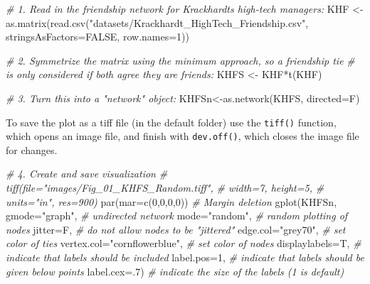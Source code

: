 \documentclass[
  notitlepage,
  onecolumn,
  openany]{book}
\newenvironment{Shaded}{\begin{snugshade}}{\end{snugshade}}
\newcommand{\AttributeTok}[1]{\textcolor[rgb]{0.77,0.63,0.00}{#1}}
\newcommand{\CommentTok}[1]{\textcolor[rgb]{0.56,0.35,0.01}{\textit{#1}}}
\newcommand{\ConstantTok}[1]{\textcolor[rgb]{0.00,0.00,0.00}{#1}}
\newcommand{\DecValTok}[1]{\textcolor[rgb]{0.00,0.00,0.81}{#1}}
\newcommand{\FunctionTok}[1]{\textcolor[rgb]{0.00,0.00,0.00}{#1}}
\newcommand{\NormalTok}[1]{#1}
\newcommand{\OtherTok}[1]{\textcolor[rgb]{0.56,0.35,0.01}{#1}}
\newcommand{\SpecialCharTok}[1]{\textcolor[rgb]{0.00,0.00,0.00}{#1}}
\newcommand{\StringTok}[1]{\textcolor[rgb]{0.31,0.60,0.02}{#1}}
\begin{document}
\begin{Shaded}
\begin{Highlighting}[]
\CommentTok{\# 1. Read in the friendship network for Krackhardt\textquotesingle{}s high{-}tech managers:}
\NormalTok{KHF }\OtherTok{\textless{}{-}} \FunctionTok{as.matrix}\NormalTok{(}\FunctionTok{read.csv}\NormalTok{(}\StringTok{"datasets/Krackhardt\_HighTech\_Friendship.csv"}\NormalTok{,}
                          \AttributeTok{stringsAsFactors=}\ConstantTok{FALSE}\NormalTok{, }\AttributeTok{row.names=}\DecValTok{1}\NormalTok{))}


\CommentTok{\# 2. Symmetrize the matrix using the minimum approach, so a friendship tie}
\CommentTok{\# is only considered if both agree they are friends:}
\NormalTok{KHFS }\OtherTok{\textless{}{-}}\NormalTok{ KHF}\SpecialCharTok{*}\FunctionTok{t}\NormalTok{(KHF)}

\CommentTok{\# 3. Turn this into a "network" object:}
\NormalTok{KHFSn}\OtherTok{\textless{}{-}}\FunctionTok{as.network}\NormalTok{(KHFS, }\AttributeTok{directed=}\NormalTok{F)}
\end{Highlighting}
\end{Shaded}

To save the plot as a tiff file (in the default folder) use the \texttt{tiff()} function, which opens an image file,
and finish with \texttt{dev.off()}, which closes the image file for changes.

\begin{Shaded}
\begin{Highlighting}[]
\CommentTok{\# 4. Create and save visualization}
\CommentTok{\# tiff(file="images/Fig\_01\_KHFS\_Random.tiff", }
\CommentTok{\#      width=7, height=5,}
\CommentTok{\#      units="in", res=900)}
\FunctionTok{par}\NormalTok{(}\AttributeTok{mar=}\FunctionTok{c}\NormalTok{(}\DecValTok{0}\NormalTok{,}\DecValTok{0}\NormalTok{,}\DecValTok{0}\NormalTok{,}\DecValTok{0}\NormalTok{)) }\CommentTok{\# Margin deletion}
\FunctionTok{gplot}\NormalTok{(KHFSn,}
      \AttributeTok{gmode=}\StringTok{"graph"}\NormalTok{,      }\CommentTok{\# undirected network}
      \AttributeTok{mode=}\StringTok{"random"}\NormalTok{,      }\CommentTok{\# random plotting of nodes}
      \AttributeTok{jitter=}\NormalTok{F,           }\CommentTok{\# do not allow nodes to be "jittered"}
      \AttributeTok{edge.col=}\StringTok{"grey70"}\NormalTok{,  }\CommentTok{\# set color of ties}
      \AttributeTok{vertex.col=}\StringTok{"cornflowerblue"}\NormalTok{,   }\CommentTok{\# set color of nodes}
      \AttributeTok{displaylabels=}\NormalTok{T,    }\CommentTok{\# indicate that labels should be included}
      \AttributeTok{label.pos=}\DecValTok{1}\NormalTok{,        }\CommentTok{\# indicate that labels should be given below points}
      \AttributeTok{label.cex=}\NormalTok{.}\DecValTok{7}\NormalTok{)       }\CommentTok{\# indicate the size of the labels (1 is default)}
\end{Highlighting}
\end{Shaded}
\end{document}
